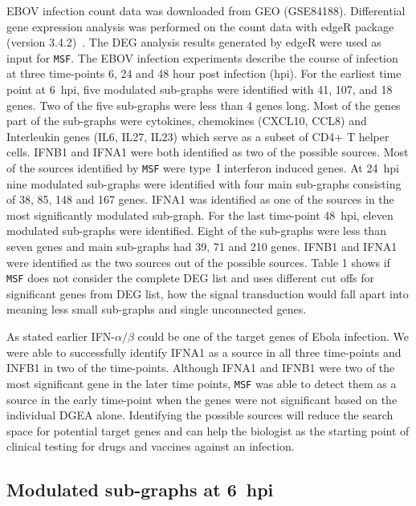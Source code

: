 \documentclass[10pt,a4paper,twocolumn]{article}
\begin{document}
EBOV infection count data was downloaded from GEO (GSE84188). Differential
gene expression analysis was performed on the count data with edgeR package
(version 3.4.2)~\cite{edgeR}. The DEG analysis results generated by edgeR
were used as input for \texttt{MSF}. The EBOV infection experiments
describe the course of infection at three time-points 6, 24 and 48 hour
post infection (hpi). For the earliest time point at 6~hpi, five modulated
sub-graphs were identified with 41, 107, and 18 genes. Two of the five
sub-graphs were less than 4 genes long. Most of the genes part of the
sub-graphs were cytokines, chemokines (CXCL10, CCL8) and Interleukin genes
(IL6, IL27, IL23) which serve as a subset of CD4+ T helper cells. IFNB1 and
IFNA1 were both identified as two of the possible sources. Most of the
sources identified by \texttt{MSF} were type~I interferon induced genes. At
24~hpi nine modulated sub-graphs were identified with four main sub-graphs
consisting of 38, 85, 148 and 167 genes. IFNA1 was identified as one of the
sources in the most significantly modulated sub-graph. For the last
time-point 48~hpi, eleven modulated sub-graphs were identified. Eight of
the sub-graphs were less than seven genes and main sub-graphs had 39, 71
and 210 genes. IFNB1 and IFNA1 were identified as the two sources out of
the possible sources. Table 1 shows if \texttt{MSF} does not consider the complete DEG list and uses different cut offs for significant genes from DEG list, how the signal transduction would fall apart into meaning less small sub-graphs and single unconnected genes.

As stated earlier IFN-$\alpha / \beta$ could be one of the target
genes of Ebola infection. We were able to successfully identify IFNA1
as a source in all three time-points and INFB1 in two of the
time-points. Although IFNA1 and IFNB1 were two of the most significant
gene in the later time points, \texttt{MSF} was able to detect them as
a source in the early time-point when the genes were not significant
based on the individual DGEA alone. Identifying the possible sources will
reduce the search space for potential target genes and can help the
biologist as the starting point of clinical testing for drugs and
vaccines against an infection.



\subsection*{Modulated sub-graphs at 6~hpi}
\end{document}
